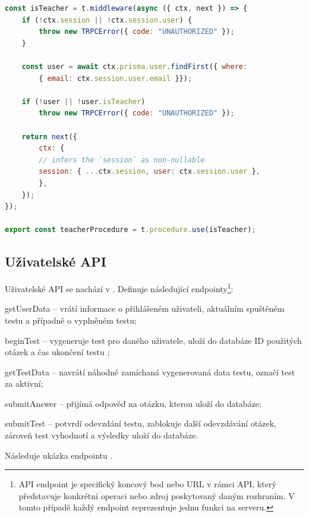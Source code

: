 \begin{lstlisting}[language=JavaScript,caption={Kontrola přístupu do učitelského rozhraní}]
const isTeacher = t.middleware(async ({ ctx, next }) => {
    if (!ctx.session || !ctx.session.user) {
        throw new TRPCError({ code: "UNAUTHORIZED" });
    }
    
    const user = await ctx.prisma.user.findFirst({ where: 
        { email: ctx.session.user.email }});

    if (!user || !user.isTeacher)
        throw new TRPCError({ code: "UNAUTHORIZED" });
    
    return next({
        ctx: {
        // infers the `session` as non-nullable
        session: { ...ctx.session, user: ctx.session.user },
        },
    });
});

export const teacherProcedure = t.procedure.use(isTeacher);
\end{lstlisting}

\subsection{Uživatelské API}
\label{userapi}

Uživatelské API se nachází v . Definuje následující endpointy\footnote{API endpoint je specifický koncový bod nebo URL v rámci API, který představuje konkrétní operaci nebo zdroj poskytovaný daným rozhraním. V tomto případě každý endpoint reprezentuje jednu funkci na serveru.}:

\begin{compactitem}
    \item getUserData -- vrátí informace o přihlášeném uživateli, aktuálním spuštěném testu a případně o vyplněném testu;
    \item beginTest -- vygeneruje test pro daného uživatele, uloží do databáze ID použitých otázek a čas ukončení testu ;
    \item getTestData -- navrátí náhodně zamíchaná vygenerovaná data testu, označí test za aktivní;
    \item submitAnswer -- přijímá odpověď na otázku, kterou uloží do databáze;
    \item submitTest -- potvrdí odevzdání testu, zablokuje další odevzdávání otázek, zároveň test vyhodnotí a výsledky uloží do databáze.
\end{compactitem}

Následuje ukázka endpointu .

